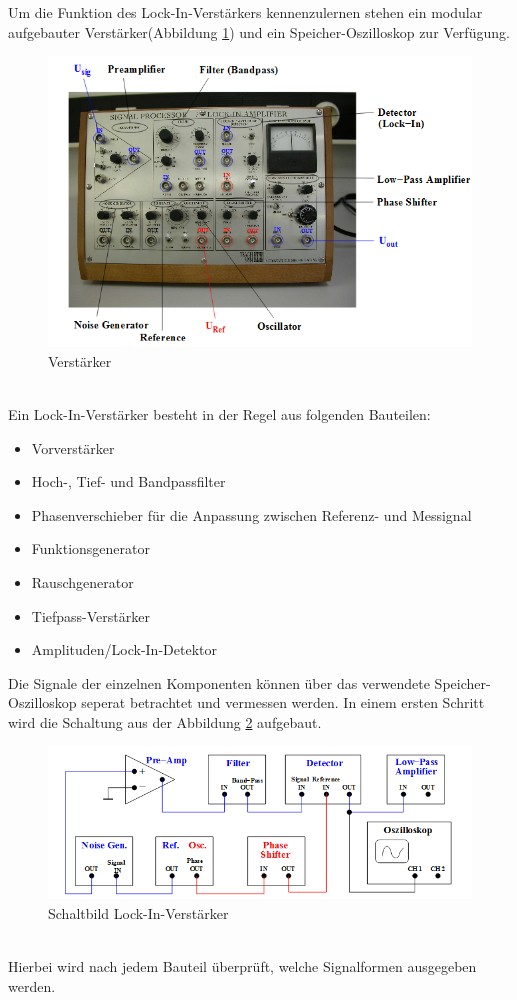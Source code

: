 Um die Funktion des Lock-In-Verstärkers kennenzulernen stehen ein modular
aufgebauter Verstärker(Abbildung \ref{fig:verstärker}) und ein
Speicher-Oszilloskop zur Verfügung.
\begin{figure}[h]
  \centering
  \includegraphics[width=\textwidth]{Bilder/Verstaerker.jpeg}
  \caption{Verstärker}
  \label{fig:verstärker}
\end{figure}
\\
Ein Lock-In-Verstärker besteht in der Regel aus folgenden Bauteilen:
\begin{itemize}
  \item Vorverstärker
  \item Hoch-, Tief- und Bandpassfilter
  \item Phasenverschieber für die Anpassung zwischen Referenz- und Messignal
  \item Funktionsgenerator
  \item Rauschgenerator
  \item Tiefpass-Verstärker
  \item Amplituden/Lock-In-Detektor
\end{itemize}
Die Signale der einzelnen Komponenten können über das verwendete
Speicher-Oszilloskop seperat betrachtet und vermessen werden.
In einem ersten Schritt wird die Schaltung aus der Abbildung \ref{fig:schalt}
aufgebaut.
\begin{figure}
  \centering
  \includegraphics[width=\textwidth]{Bilder/Schaltung.jpeg}
  \caption{Schaltbild Lock-In-Verstärker}
  \label{fig:schalt}
\end{figure}
\\
Hierbei wird nach jedem Bauteil überprüft, welche Signalformen ausgegeben werden.
